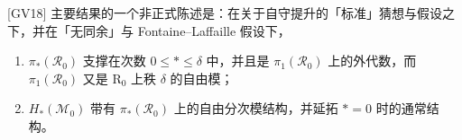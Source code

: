 [GV18] 主要结果的一个非正式陈述是：在关于自守提升的「标准」猜想与假设之下，并在「无同余」与 Fontaine--Laffaille 假设下，
\begin{enumerate}[leftmargin=1.8em]
\item $\pi_*(\mathcal R_0)$ 支撑在次数 $0\le *\le\delta$ 中，并且是 $\pi_1(\mathcal R_0)$ 上的外代数，而 $\pi_1(\mathcal R_0)$ 又是 $\mathrm R_0$ 上秩 $\delta$ 的自由模；
\item $H_*(\mathcal M_0)$ 带有 $\pi_*(\mathcal R_0)$ 上的自由分次模结构，并延拓 $*=0$ 时的通常结构。
\end{enumerate}

